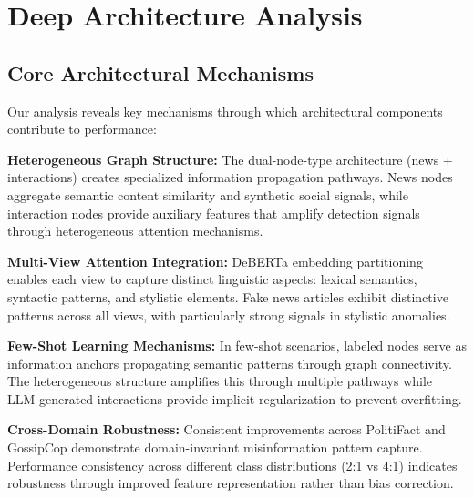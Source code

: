 \section{Deep Architecture Analysis}

\subsection{Core Architectural Mechanisms}

Our analysis reveals key mechanisms through which architectural components contribute to performance:

\textbf{Heterogeneous Graph Structure:} The dual-node-type architecture (news + interactions) creates specialized information propagation pathways. News nodes aggregate semantic content similarity and synthetic social signals, while interaction nodes provide auxiliary features that amplify detection signals through heterogeneous attention mechanisms.

\textbf{Multi-View Attention Integration:} DeBERTa embedding partitioning enables each view to capture distinct linguistic aspects: lexical semantics, syntactic patterns, and stylistic elements. Fake news articles exhibit distinctive patterns across all views, with particularly strong signals in stylistic anomalies.

\textbf{Few-Shot Learning Mechanisms:} In few-shot scenarios, labeled nodes serve as information anchors propagating semantic patterns through graph connectivity. The heterogeneous structure amplifies this through multiple pathways while LLM-generated interactions provide implicit regularization to prevent overfitting.

\textbf{Cross-Domain Robustness:} Consistent improvements across PolitiFact and GossipCop demonstrate domain-invariant misinformation pattern capture. Performance consistency across different class distributions (2:1 vs 4:1) indicates robustness through improved feature representation rather than bias correction.

\EndChapter
